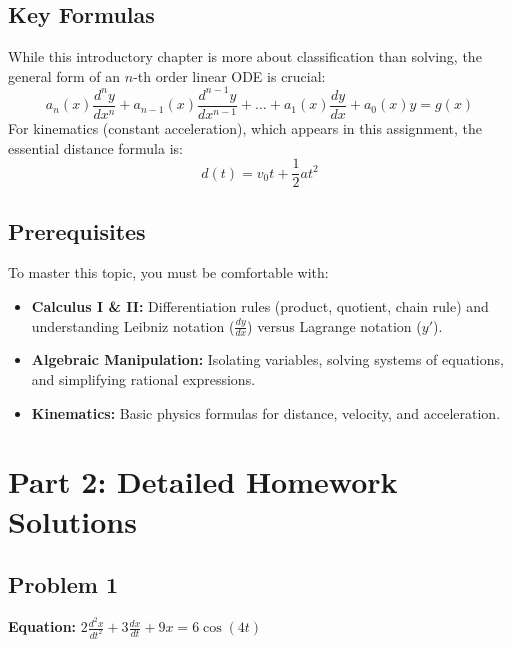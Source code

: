 \documentclass[11pt]{article}
\begin{document}
\subsection{Key Formulas}
While this introductory chapter is more about classification than solving, the general form of an $n$-th order linear ODE is crucial:
\[ a_n(x)\frac{d^n y}{dx^n} + a_{n-1}(x)\frac{d^{n-1} y}{dx^{n-1}} + \dots + a_1(x)\frac{dy}{dx} + a_0(x)y = g(x) \]
For kinematics (constant acceleration), which appears in this assignment, the essential distance formula is:
\[ d(t) = v_0 t + \frac{1}{2}a t^2 \]

\subsection{Prerequisites}
To master this topic, you must be comfortable with:
\begin{itemize}
    \item \textbf{Calculus I \& II:} Differentiation rules (product, quotient, chain rule) and understanding Leibniz notation ($\frac{dy}{dx}$) versus Lagrange notation ($y'$).
    \item \textbf{Algebraic Manipulation:} Isolating variables, solving systems of equations, and simplifying rational expressions.
    \item \textbf{Kinematics:} Basic physics formulas for distance, velocity, and acceleration.
\end{itemize}

\section{Part 2: Detailed Homework Solutions}

\subsection*{Problem 1}
\textbf{Equation:} $2\frac{d^2x}{dt^2} + 3\frac{dx}{dt} + 9x = 6\cos(4t)$
\vspace{0.2cm}
\end{document}
